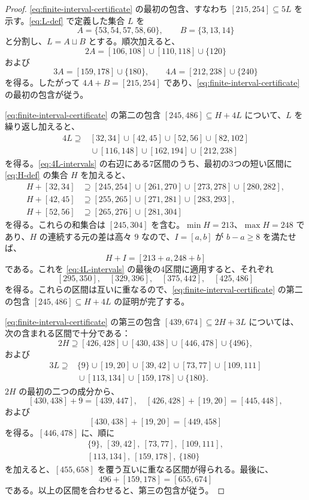 \documentclass[12pt]{ltjsarticle}
\theoremstyle{plain}
\theoremstyle{definition}
\theoremstyle{plain}
\begin{document}
\begin{proof}
\eqref{eq:finite-interval-certificate} の最初の包含、すなわち $[215,254]\subseteq5L$ を示す。\eqref{eq:L-def} で定義した集合 $L$ を
\[
 A=\{53,54,57,58,60\},\qquad B=\{3,13,14\}
\]
と分割し、$L=A\sqcup B$ とする。順次加えると、
\[
 2A=[106,108]\cup[110,118]\cup\{120\}
\]
および
\[
 3A=[159,178]\cup\{180\},\qquad
 4A=[212,238]\cup\{240\}
\]
を得る。したがって $4A+B=[215,254]$ であり、\eqref{eq:finite-interval-certificate} の最初の包含が従う。

\eqref{eq:finite-interval-certificate} の第二の包含 $[245,486]\subseteq H+4L$ について、$L$ を繰り返し加えると、
\begin{equation}\label{eq:4L-intervals}
\begin{split}
4L\supseteq{}&[32,34]\cup[42,45]\cup[52,56]\cup[82,102]\\
 &{}\cup[116,148]\cup[162,194]\cup[212,238]
\end{split}
\end{equation}
を得る。\eqref{eq:4L-intervals} の右辺にある7区間のうち、最初の3つの短い区間に \eqref{eq:H-def} の集合 $H$ を加えると、
\[
\begin{aligned}
H+[32,34]&\supseteq[245,254]\cup[261,270]
 \cup[273,278]\cup[280,282],\\
H+[42,45]&\supseteq[255,265]\cup[271,281]\cup[283,293],\\
H+[52,56]&\supseteq[265,276]\cup[281,304]
\end{aligned}
\]
を得る。これらの和集合は $[245,304]$ を含む。$\min H=213$、$\max H=248$ であり、$H$ の連続する元の差は高々 $9$ なので、$I=[a,b]$ が $b-a\geq8$ を満たせば、
\[
 H+I=[213+a,248+b]
\]
である。これを \eqref{eq:4L-intervals} の最後の4区間に適用すると、それぞれ
\[
 [295,350],\quad[329,396],\quad[375,442],\quad[425,486]
\]
を得る。これらの区間は互いに重なるので、\eqref{eq:finite-interval-certificate} の第二の包含 $[245,486]\subseteq H+4L$ の証明が完了する。

\eqref{eq:finite-interval-certificate} の第三の包含 $[439,674]\subseteq2H+3L$ については、次の含まれる区間で十分である：
\[
 2H\supseteq[426,428]\cup[430,438]\cup[446,478]\cup\{496\},
\]
および
\[
\begin{split}
3L\supseteq{}&\{9\}\cup[19,20]\cup[39,42]\cup[73,77]
 \cup[109,111]\\
 &{}\cup[113,134]\cup[159,178]\cup\{180\}.
\end{split}
\]
$2H$ の最初の二つの成分から、
\[
 [430,438]+9=[439,447],\quad
 [426,428]+[19,20]=[445,448],
\]
および
\[
 [430,438]+[19,20]=[449,458]
\]
を得る。$[446,478]$ に、順に
\[
\begin{gathered}
 \{9\},\ [39,42],\ [73,77],\ [109,111],\\
 [113,134],\ [159,178],\ \{180\}
\end{gathered}
\]
を加えると、$[455,658]$ を覆う互いに重なる区間が得られる。最後に、
\[
 496+[159,178]=[655,674]
\]
である。以上の区間を合わせると、第三の包含が従う。


\end{proof}
\end{document}
